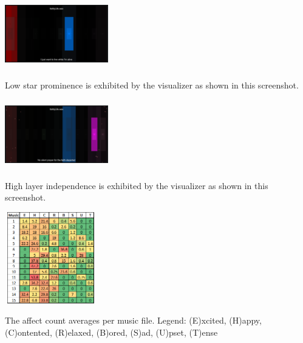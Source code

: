 \documentclass{sigchi-ext}
\begin{document}
\begin{marginfigure}[-8pc]
\begin{minipage}{\marginparwidth}
     \includegraphics[width=4.5cm,height=3cm]{figures/LowStarVsisibility.png}
    \caption{Low star prominence is exhibited by the visualizer as shown in this screenshot.}
    \label{fig:lowstar}
    \end{minipage}
\end{marginfigure}

\begin{marginfigure}[1pc]
\begin{minipage}{\marginparwidth}
     \includegraphics[width=4.5cm,height=3cm]{figures/HighLayerIndependence.png}
    \caption{High layer independence is exhibited by the visualizer as shown in this screenshot.}
    \label{fig:highindependence}
    \end{minipage}
\end{marginfigure}

\begin{marginfigure}[1pc]
\begin{minipage}{\marginparwidth}
     \includegraphics[width=4cm,height=4cm]{figures/Affects.png}
    \caption{The affect count averages per music file. Legend: (E)xcited, (H)appy, (C)ontented, (R)elaxed, (B)ored, (S)ad, (U)pset, (T)ense}
    \label{fig:affects}
    \end{minipage}
\end{marginfigure}
\end{document}
